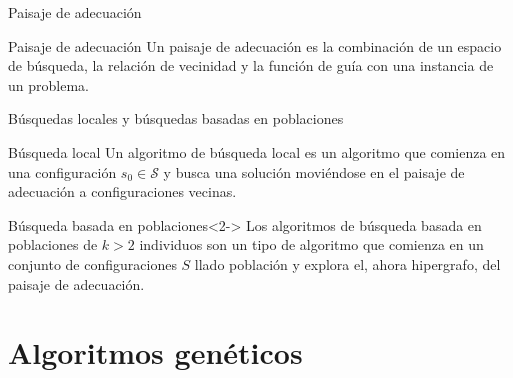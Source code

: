 \documentclass[aspectratio=169,table,xcdraw]{beamer}
\begin{document}
\begin{frame}{Paisaje de adecuación}
    \begin{block}{Paisaje de adecuación}
        Un paisaje de adecuación es la combinación de un espacio de búsqueda, la relación de vecinidad y la función de guía con una instancia de un problema. 
    \end{block}
    \begin{figure}
        \hspace{1.1cm}
    \end{figure}
    
\end{frame}
\begin{frame}{Búsquedas locales y búsquedas basadas en poblaciones}
    \begin{block}{Búsqueda local}
        Un algoritmo de \alert{búsqueda local} es un algoritmo que comienza en una configuración $s_0\in \mathcal{S}$ y busca una solución moviéndose en el paisaje de adecuación a configuraciones vecinas.
    \end{block}
    \vspace{0.5cm}
    \begin{block}{Búsqueda basada en poblaciones}<2->
        Los algoritmos de \alert{búsqueda basada en poblaciones} de $k>2$ individuos son un tipo de algoritmo que comienza en un conjunto de configuraciones $S$ llado población y explora el, ahora hipergrafo, del paisaje de adecuación.
    \end{block}
\end{frame}

\section{Algoritmos genéticos}
\end{document}
